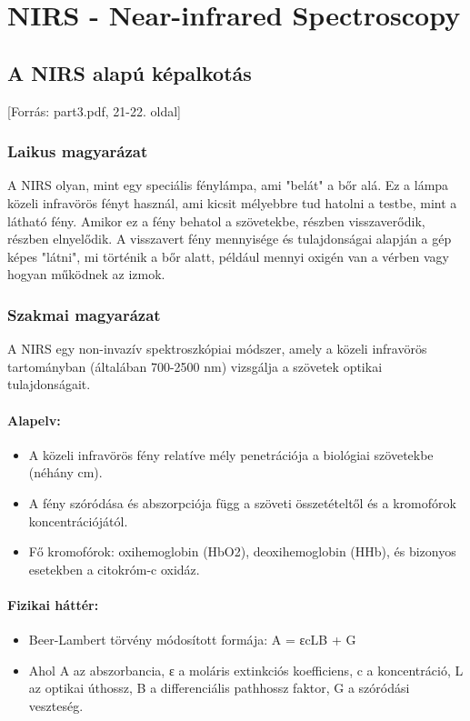 \documentclass[a4paper,12pt]{article}
\begin{document}
\newpage

\section{NIRS - Near-infrared Spectroscopy}

\subsection{A NIRS alapú képalkotás} [Forrás: part3.pdf, 21-22. oldal]

\subsubsection{Laikus magyarázat} A NIRS olyan, mint egy speciális fénylámpa, ami "belát" a bőr alá. Ez a lámpa közeli infravörös fényt használ, ami kicsit mélyebbre tud hatolni a testbe, mint a látható fény. Amikor ez a fény behatol a szövetekbe, részben visszaverődik, részben elnyelődik. A visszavert fény mennyisége és tulajdonságai alapján a gép képes "látni", mi történik a bőr alatt, például mennyi oxigén van a vérben vagy hogyan működnek az izmok.

\subsubsection{Szakmai magyarázat} A NIRS egy non-invazív spektroszkópiai módszer, amely a közeli infravörös tartományban (általában 700-2500 nm) vizsgálja a szövetek optikai tulajdonságait.

\paragraph{Alapelv:} \begin{itemize} \item A közeli infravörös fény relatíve mély penetrációja a biológiai szövetekbe (néhány cm). \item A fény szóródása és abszorpciója függ a szöveti összetételtől és a kromofórok koncentrációjától. \item Fő kromofórok: oxihemoglobin (HbO2), deoxihemoglobin (HHb), és bizonyos esetekben a citokróm-c oxidáz. \end{itemize}

\paragraph{Fizikai háttér:} \begin{itemize} \item Beer-Lambert törvény módosított formája: A = εcLB + G \item Ahol A az abszorbancia, ε a moláris extinkciós koefficiens, c a koncentráció, L az optikai úthossz, B a differenciális pathhossz faktor, G a szóródási veszteség. \end{itemize}
\end{document}
